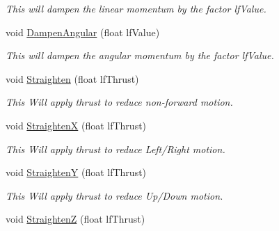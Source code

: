 \begin{DoxyCompactItemize}
\begin{DoxyCompactList}\small\item\em This will dampen the linear momentum by the factor lfValue. \end{DoxyCompactList}\item 
\hypertarget{classc_momentum_a761435c725896ef0f60452a68fdddaf4}{
void \hyperlink{classc_momentum_a761435c725896ef0f60452a68fdddaf4}{DampenAngular} (float lfValue)}
\label{classc_momentum_a761435c725896ef0f60452a68fdddaf4}

\begin{DoxyCompactList}\small\item\em This will dampen the angular momentum by the factor lfValue. \end{DoxyCompactList}\item 
\hypertarget{classc_momentum_a9f6e219b6b7de80f9ed48f8424a54db5}{
void \hyperlink{classc_momentum_a9f6e219b6b7de80f9ed48f8424a54db5}{Straighten} (float lfThrust)}
\label{classc_momentum_a9f6e219b6b7de80f9ed48f8424a54db5}

\begin{DoxyCompactList}\small\item\em This Will apply thrust to reduce non-\/forward motion. \end{DoxyCompactList}\item 
\hypertarget{classc_momentum_a791aadaf8e6ac5454ae3010fed305491}{
void \hyperlink{classc_momentum_a791aadaf8e6ac5454ae3010fed305491}{StraightenX} (float lfThrust)}
\label{classc_momentum_a791aadaf8e6ac5454ae3010fed305491}

\begin{DoxyCompactList}\small\item\em This Will apply thrust to reduce Left/Right motion. \end{DoxyCompactList}\item 
\hypertarget{classc_momentum_aeedc30da55072e8474cd953f5c4a73ae}{
void \hyperlink{classc_momentum_aeedc30da55072e8474cd953f5c4a73ae}{StraightenY} (float lfThrust)}
\label{classc_momentum_aeedc30da55072e8474cd953f5c4a73ae}

\begin{DoxyCompactList}\small\item\em This Will apply thrust to reduce Up/Down motion. \end{DoxyCompactList}\item 
\hypertarget{classc_momentum_acb62a85b38989877c8388361c52077ff}{
void \hyperlink{classc_momentum_acb62a85b38989877c8388361c52077ff}{StraightenZ} (float lfThrust)}
\label{classc_momentum_acb62a85b38989877c8388361c52077ff}


\end{DoxyCompactItemize}

